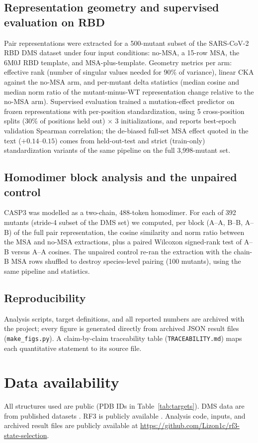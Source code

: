 \documentclass[11pt]{article}
\begin{document}
\subsection{Representation geometry and supervised evaluation on RBD}
Pair representations were extracted for a 500-mutant subset of the
SARS-CoV-2 RBD DMS dataset \cite{starr2020} under four input conditions:
no-MSA, a 15-row MSA, the 6M0J RBD template, and MSA-plus-template.
Geometry metrics per arm: effective rank (number of singular values needed
for 90\% of variance), linear CKA against the no-MSA arm, and per-mutant
delta statistics (median cosine and median norm ratio of the mutant-minus-WT
representation change relative to the no-MSA arm). Supervised evaluation
trained a mutation-effect predictor on frozen representations with
per-position standardization, using 5 cross-position splits (30\% of
positions held out) $\times$ 3 initializations, and reports best-epoch
validation Spearman correlation; the de-biased full-set MSA effect quoted in
the text ($+0.14$--$0.15$) comes from held-out-test and strict
(train-only) standardization variants of the same pipeline on the full
3{,}998-mutant set.

\subsection{Homodimer block analysis and the unpaired control}
CASP3 was modelled as a two-chain, 488-token homodimer. For each of 392
mutants (stride-4 subset of the DMS set) we computed, per block
(A--A, B--B, A--B) of the full pair representation, the cosine similarity
and norm ratio between the MSA and no-MSA extractions, plus a paired
Wilcoxon signed-rank test of A--B versus A--A cosines. The unpaired control
re-ran the extraction with the chain-B MSA rows shuffled to destroy
species-level pairing (100 mutants), using the same pipeline and statistics.

\subsection{Reproducibility}
Analysis scripts, target definitions, and all reported numbers are archived
with the project; every figure is generated directly from archived JSON
result files (\texttt{make\_figs.py}). A claim-by-claim traceability table
(\texttt{TRACEABILITY.md}) maps each quantitative statement to its source
file.

\section*{Data availability}
All structures used are public (PDB IDs in Table~\ref{tab:targets}). DMS
data are from published datasets \cite{starr2020,roychowdhury2022}. RF3 is
publicly available \cite{corley2025}. Analysis code, inputs, and archived
result files are publicly available at
\url{https://github.com/Lizon1c/rf3-state-selection}.
\end{document}
